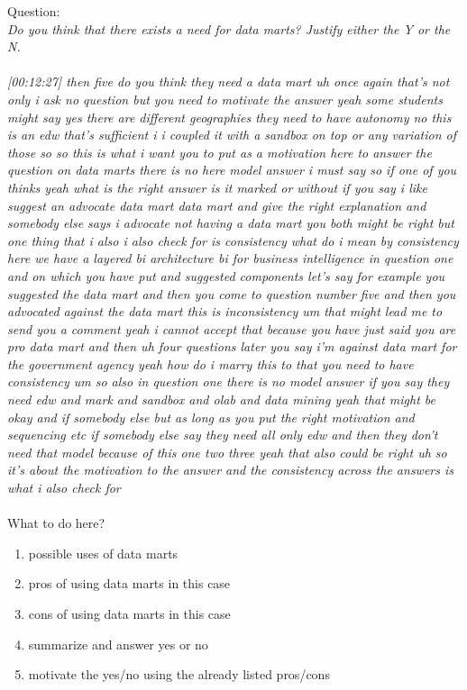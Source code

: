 Question:\\
\emph{
    Do you think that there exists a need for data marts? Justify either the Y or the N.
}\\\\
\emph{[00:12:27] then five do you think they need a data mart uh once again that's not only i
ask no question but you need to motivate the answer yeah some students might say yes
there are different geographies they need to have autonomy no this is an edw that's sufficient i
i coupled it with a sandbox on top or any variation of those so so this is what i want you to put
as a motivation here to answer the question on data marts there is no here model answer i must say so if one
of you thinks yeah what is the right answer is it marked or without if you say i like suggest an advocate data mart
data mart and give the right explanation and somebody else says i advocate not having a data mart you both
might be right but one thing that i also i also check for is consistency what do i mean by consistency
here we have a layered bi architecture bi for business intelligence in question one and on which you have put
and suggested components let's say for example you suggested the data mart and then you come to
question number five and then you advocated against the data mart this is inconsistency um that might
lead me to send you a comment yeah i cannot accept that because you have just said you are pro data mart and
then uh four questions later you say i'm against data mart for the government agency yeah how do i marry this
to that you need to have consistency um so also in question one there is no model answer if you
say they need edw and mark and sandbox and olab and data mining yeah that might be okay and if somebody
else but as long as you put the right motivation and sequencing etc if somebody else say they need
all only edw and then they don't need that model because of this one two three yeah that also could be
right uh so it's about the motivation to the answer and the consistency across the answers
is what i also check for}\\\\

What to do here?
\begin{enumerate}
    \item possible uses of data marts
    \item pros of using data marts in this case
    \item cons of using data marts in this case
    \item summarize and answer yes or no
    \item motivate the yes/no using the already listed pros/cons
  \end{enumerate}

